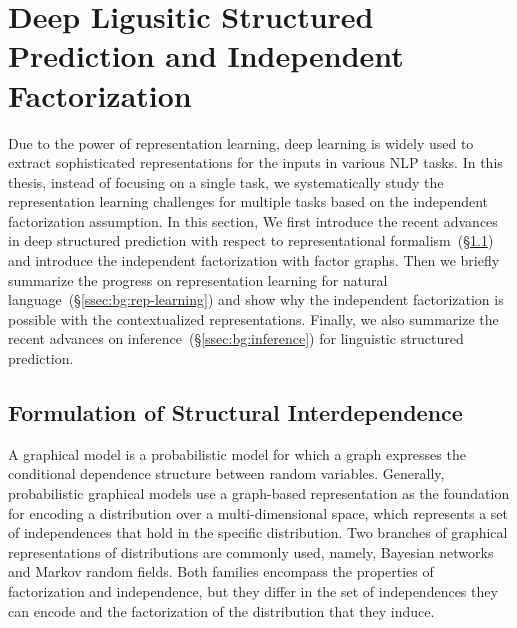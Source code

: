\section{Deep Ligusitic Structured Prediction and Independent Factorization}
\label{sec:background:deepsp}

Due to the power of representation learning, deep learning is widely
used to extract sophisticated representations for the inputs in
various NLP tasks. In this thesis, instead of focusing on a single
task, we systematically study the representation learning challenges
for multiple tasks based on the independent factorization
assumption. In this section, We first introduce the recent advances
in deep structured prediction with respect to representational
formalism~(\S\ref{ssec:bg:formalism}) and introduce the independent
factorization with factor graphs. Then we briefly summarize the
progress on representation learning for natural
language~(\S\ref{ssec:bg:rep-learning}) and show why the independent
factorization is possible with the contextualized representations.
Finally, we also summarize the recent advances on
inference~(\S\ref{ssec:bg:inference}) for linguistic structured prediction.


\subsection{Formulation of Structural Interdependence}
\label{ssec:bg:formalism}

 A graphical model is a probabilistic
model for which a graph expresses the conditional dependence structure
between random variables. Generally, probabilistic graphical models
use a graph-based representation as the foundation for encoding a
distribution over a multi-dimensional space, which represents a set of
independences that hold in the specific distribution. Two branches of
graphical representations of distributions are commonly used, namely,
Bayesian networks and Markov random fields. Both families encompass
the properties of factorization and independence, but they differ in
the set of independences they can encode and the factorization of the
distribution that they induce.

